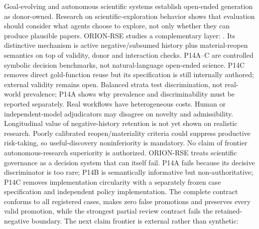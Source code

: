 \markdownRendererDocumentBegin
\markdownRendererSectionBegin
{}\markdownRendererInterblockSeparator
{}Goal-evolving and autonomous scientific systems establish open-ended generation as donor-owned. Research on scientific-exploration behavior shows that evaluation should consider what agents choose to explore, not only whether they can produce plausible papers. ORION-RSE studies a complementary layer: . Its distinctive mechanism is active negative/subsumed history plus material-reopen semantics on top of validity, donor and interaction checks.\markdownRendererInterblockSeparator
{}P14A–C are controlled symbolic decision benchmarks, not natural-language open-ended science. P14C removes direct gold-function reuse but its specification is still internally authored; external validity remains open. Balanced strata test discrimination, not real-world prevalence; P14A shows why prevalence and discriminability must be reported separately. Real workflows have heterogeneous costs. Human or independent-model adjudicators may disagree on novelty and admissibility. Longitudinal value of negative-history retention is not yet shown on realistic research. Poorly calibrated reopen/materiality criteria could suppress productive risk-taking, so useful-discovery noninferiority is mandatory. No claim of frontier autonomous-research superiority is authorized.\markdownRendererInterblockSeparator
{}ORION-RSE treats scientific governance as a decision system that can itself fail. P14A fails because its decisive discriminator is too rare; P14B is semantically informative but non-authoritative; P14C removes implementation circularity with a separately frozen case specification and independent policy implementation. The complete contract conforms to all registered cases, makes zero false promotions and preserves every valid promotion, while the strongest partial review contract fails the retained-negative boundary.\markdownRendererInterblockSeparator
{}The next claim frontier is external rather than synthetic: 
\markdownRendererSectionEnd \markdownRendererDocumentEnd